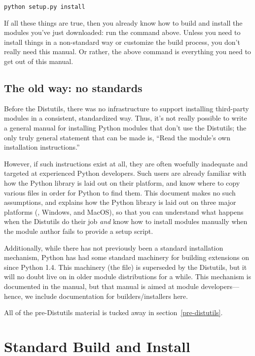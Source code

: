 \documentclass{howto}
\begin{document}
\begin{verbatim}
python setup.py install
\end{verbatim}

If all these things are true, then you already know how to build and
install the modules you've just downloaded: run the command above.
Unless you need to install things in a non-standard way or customize the
build process, you don't really need this manual.  Or rather, the above
command is everything you need to get out of this manual.


\subsection{The old way: no standards}
\label{old-way}

Before the Distutils, there was no infrastructure to support installing
third-party modules in a consistent, standardized way.  Thus, it's not
really possible to write a general manual for installing Python modules
that don't use the Distutils; the only truly general statement that can
be made is, ``Read the module's own installation instructions.''

However, if such instructions exist at all, they are often woefully
inadequate and targeted at experienced Python developers.  Such users
are already familiar with how the Python library is laid out on their
platform, and know where to copy various files in order for Python to
find them.  This document makes no such assumptions, and explains how
the Python library is laid out on three major platforms (\UNIX, Windows,
and MacOS), so that you can understand what happens when the Distutils
do their job \emph{and} know how to install modules manually when the
module author fails to provide a setup script.

Additionally, while there has not previously been a standard
installation mechanism, Python has had some standard machinery for
building extensions on \UNIX{} since Python 1.4.  This
machinery (the  file) is superseded by the
Distutils, but it will no doubt live on in older module distributions
for a while.  This  mechanism is documented in
the  manual,
but that manual is aimed at module developers---hence, we include
documentation for builders/installers here.

All of the pre-Distutils material is tucked away in
section~\ref{pre-distutils}.


\section{Standard Build and Install}
\label{standard-install}
\end{document}

